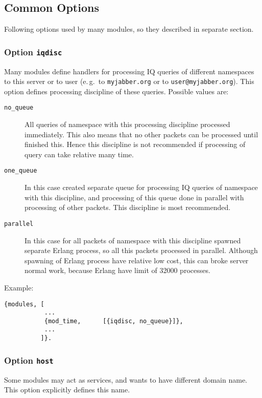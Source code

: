 \documentclass[10pt]{article}
\begin{document}
\subsection{Common Options}
\label{sec:modcommonopts}

Following options used by many modules, so they described in separate section.


\subsubsection{Option \texttt{iqdisc}}

Many modules define handlers for processing IQ queries of different namespaces
to this server or to user (e.\,g.\ to \texttt{myjabber.org} or to
\texttt{user@myjabber.org}).  This option defines processing discipline of
these queries.  Possible values are:
\begin{description}
\item[\texttt{no\_queue}] All queries of namespace with this processing
  discipline processed immediately.  This also means that no other packets can
  be processed until finished this.  Hence this discipline is not recommended
  if processing of query can take relative many time.
\item[\texttt{one\_queue}] In this case created separate queue for processing
  IQ queries of namespace with this discipline, and processing of this queue
  done in parallel with processing of other packets. This discipline is most
  recommended.
\item[\texttt{parallel}] In this case for all packets of namespace with this
  discipline spawned separate Erlang process, so all this packets processed in
  parallel.  Although spawning of Erlang process have relative low cost, this
  can broke server normal work, because Erlang have limit of 32000 processes.
\end{description}

Example:
\begin{verbatim}
{modules, [
           ...
           {mod_time,      [{iqdisc, no_queue}]},
           ...
          ]}.
\end{verbatim}


\subsubsection{Option \texttt{host}}

Some modules may act as services, and wants to have different domain name.
This option explicitly defines this name.
\end{document}
